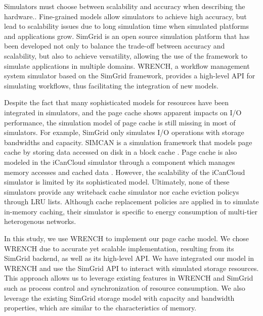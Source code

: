 \documentclass[conference]{IEEEtran}
\begin{document}
            Simulators must choose between scalability and accuracy when describing the
            hardware.\cite{casanova2014simgrid}. 
            Fine-grained models allow simulators to achieve high accuracy, 
            but lead to scalability issues due to long simulation time 
            when simulated platforms and applications grow. 
            SimGrid is an open source simulation platform that has been developed 
            not only to balance the trade-off between accuracy and scalability, 
            but also to achieve versatility, allowing the use of the framework 
            to simulate applications in multiple domains. WRENCH, a workflow management
            system simulator based on the SimGrid framework, provides a high-level API
            for simulating workflows, thus facilitating the integration of new models.
            
            Despite the fact that many sophisticated models for resources have been 
            integrated in simulators, and the page cache shows apparent impacts on I/O
            performance, the simulation model of page cache is still missing in most 
            of simulators.
            For example, SimGrid only simulates I/O operations with storage bandwidths 
            and capacity. 
            SIMCAN is a simulation framework that models page cache by storing data 
            accessed on disk in a block cache \cite{nunez2012simcan}. 
            Page cache is also modeled in the iCanCloud simulator through a component which
            manages memory accesses and cached data \cite{nunez2012icancloud}. However,
            the scalability of the iCanCloud simulator is limited by its sophisticated model.
            Ultimately, none of these simulators provide any writeback cache simulator nor
            cache eviction policys through LRU lists.
            Although cache replacement policies are applied in \cite{xu2018saving} to simulate 
            in-memory caching, their simulator is specific to energy consumption of multi-tier 
            heterogenous networks.
            

            In this study, we use WRENCH 
            to implement our page cache model. We chose WRENCH due to accurate yet scalable implementation, resulting
            from its SimGrid backend, as well as its high-level API.
            We have integrated our model in WRENCH and use the SimGrid API to interact with 
            simulated storage resources.
            This approach allows us to leverage existing features in WRENCH and SimGrid such as process control and synchronization of 
            resource consumption.
            We also leverage the existing SimGrid storage model with capacity 
            and bandwidth properties, which are similar to the characteristics of memory.
            
\end{document}
